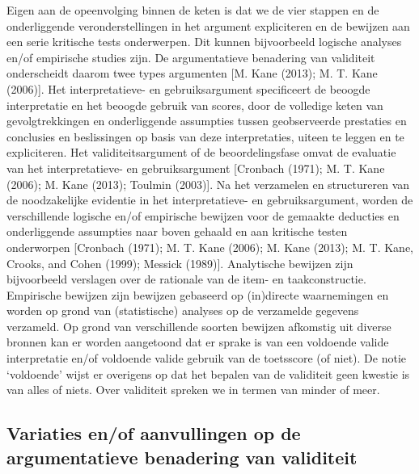\documentclass[
  letterpaper,
]{report}
\begin{document}
Eigen aan de opeenvolging binnen de keten is dat we de vier stappen en
de onderliggende veronderstellingen in het argument expliciteren en de
bewijzen aan een serie kritische tests onderwerpen. Dit kunnen
bijvoorbeeld logische analyses en/of empirische studies zijn. De
argumentatieve benadering van validiteit onderscheidt daarom twee types
argumenten {[}M. Kane (2013); M. T. Kane (2006){]}. Het interpretatieve-
en gebruiksargument specificeert de beoogde interpretatie en het beoogde
gebruik van scores, door de volledige keten van gevolgtrekkingen en
onderliggende assumpties tussen geobserveerde prestaties en conclusies
en beslissingen op basis van deze interpretaties, uiteen te leggen en te
expliciteren. Het validiteitsargument of de beoordelingsfase omvat de
evaluatie van het interpretatieve- en gebruiksargument {[}Cronbach
(1971); M. T. Kane (2006); M. Kane (2013); Toulmin (2003){]}. Na het
verzamelen en structureren van de noodzakelijke evidentie in het
interpretatieve- en gebruiksargument, worden de verschillende logische
en/of empirische bewijzen voor de gemaakte deducties en onderliggende
assumpties naar boven gehaald en aan kritische testen onderworpen
{[}Cronbach (1971); M. T. Kane (2006); M. Kane (2013); M. T. Kane,
Crooks, and Cohen (1999); Messick (1989){]}. Analytische bewijzen zijn
bijvoorbeeld verslagen over de rationale van de item- en
taakconstructie. Empirische bewijzen zijn bewijzen gebaseerd op
(in)directe waarnemingen en worden op grond van (statistische) analyses
op de verzamelde gegevens verzameld. Op grond van verschillende soorten
bewijzen afkomstig uit diverse bronnen kan er worden aangetoond dat er
sprake is van een voldoende valide interpretatie en/of voldoende valide
gebruik van de toetsscore (of niet). De notie `voldoende' wijst er
overigens op dat het bepalen van de validiteit geen kwestie is van alles
of niets. Over validiteit spreken we in termen van minder of meer.

\hypertarget{variaties-enof-aanvullingen-op-de-argumentatieve-benadering-van-validiteit}{%
\subsection{Variaties en/of aanvullingen op de argumentatieve benadering
van
validiteit}\label{variaties-enof-aanvullingen-op-de-argumentatieve-benadering-van-validiteit}}
\end{document}
